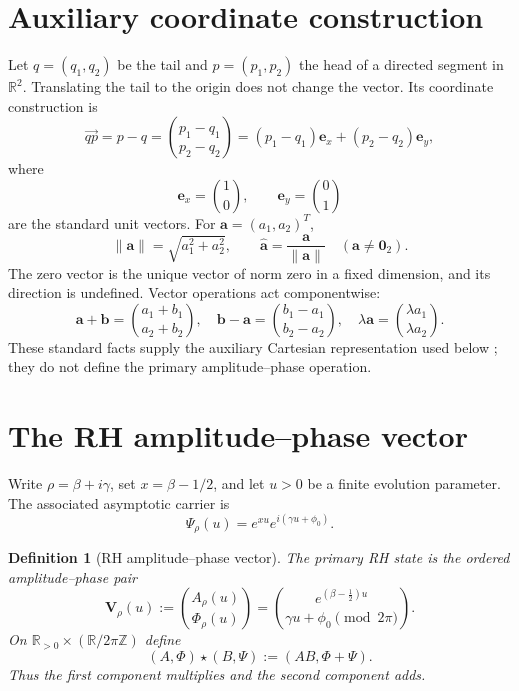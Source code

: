 \documentclass[11pt]{article}
\newtheorem{definition}{Definition}[section]
\newcommand{\vzero}{\mathbf 0}
\begin{document}
\section{Auxiliary coordinate construction}
Let $q=(q_1,q_2)$ be the tail and $p=(p_1,p_2)$ the head of a directed segment in
$\mathbb R^2$.  Translating the tail to the origin does not change the vector.  Its coordinate
construction is
\begin{equation}\label{eq:displacement}
 \overrightarrow{qp}=p-q
 =\binom{p_1-q_1}{p_2-q_2}
 =(p_1-q_1)\mathbf e_x+(p_2-q_2)\mathbf e_y,
\end{equation}
where
\begin{equation}
 \mathbf e_x=\binom10,\qquad \mathbf e_y=\binom01
\end{equation}
are the standard unit vectors.  For $\mathbf a=(a_1,a_2)^T$,
\begin{equation}\label{eq:norm-direction}
 \|\mathbf a\|=\sqrt{a_1^2+a_2^2},\qquad
 \widehat{\mathbf a}=\frac{\mathbf a}{\|\mathbf a\|}\quad(\mathbf a\ne\vzero_2).
\end{equation}
The zero vector is the unique vector of norm zero in a fixed dimension, and its direction is
undefined.  Vector operations act componentwise:
\begin{equation}
 \mathbf a+\mathbf b=\binom{a_1+b_1}{a_2+b_2},\quad
 \mathbf b-\mathbf a=\binom{b_1-a_1}{b_2-a_2},\quad
 \lambda\mathbf a=\binom{\lambda a_1}{\lambda a_2}.
\end{equation}
These standard facts supply the auxiliary Cartesian representation used below
\cite{HornJohnson,MathInsightVectors}; they do not define the primary amplitude--phase operation.

\section{The RH amplitude--phase vector}
Write $\rho=\beta+i\gamma$, set $x=\beta-1/2$, and let $u>0$ be a finite evolution
parameter.  The associated asymptotic carrier is
\begin{equation}\label{eq:carrier}
 \Psi_\rho(u)=e^{xu}e^{i(\gamma u+\phi_0)}.
\end{equation}

\begin{definition}[RH amplitude--phase vector]\label{def:amplitude-phase}
The primary RH state is the ordered amplitude--phase pair
\begin{equation}\label{eq:amplitude-phase-vector}
 \boxed{
 \mathbf V_\rho(u)
 :=\binom{A_\rho(u)}{\Phi_\rho(u)}
 =\binom{e^{(\beta-\frac12)u}}{\gamma u+\phi_0\pmod{2\pi}}.}
\end{equation}
On $\mathbb R_{>0}\times(\mathbb R/2\pi\mathbb Z)$ define
\begin{equation}\label{eq:star-operation}
 \boxed{(A,\Phi)\star(B,\Psi):=(AB,\Phi+\Psi).}
\end{equation}
Thus the first component multiplies and the second component adds.
\end{definition}
\end{document}

